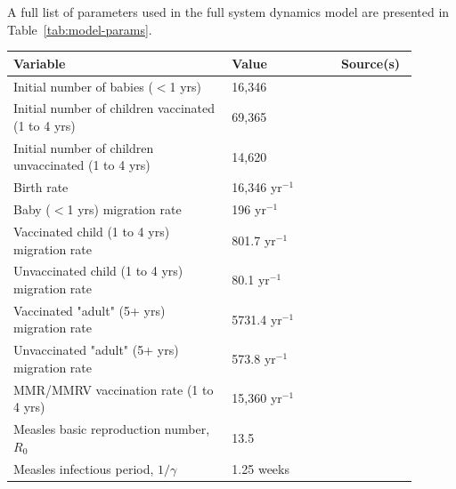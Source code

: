 \documentclass{article}
\begin{document}
A full list of parameters used in the full system dynamics model are presented in Table~\ref{tab:model-params}. 

\begin{table}[ht!]
    \begin{tabular}{p{0.5\linewidth} | p{0.25\linewidth} | p{0.15\linewidth}}
    \toprule
    \textbf{Variable} & \textbf{Value} & \textbf{Source(s)}\\ \midrule
    
    Initial number of babies ($<$1 yrs) & 16,346 & \cite{ONS2021census} \\
    
    Initial number of children vaccinated (1 to 4 yrs) & 69,365&  \cite{ONS2021census, NHSEngland2026FDP}  \\
    
    Initial number of children unvaccinated (1 to 4 yrs) & 14,620 & \cite{ONS2021census, NHSEngland2026FDP} \\
    
    Birth rate & 16,346 yr$^{-1}$ & \cite{ONS2021census} \\
    
    Baby ($<$1 yrs) migration rate & 196 yr$^{-1}$ & \cite{ONS2021census} \\
    
    Vaccinated child (1 to 4 yrs) migration rate & 801.7 yr$^{-1}$ & \cite{ONS2021census, WHO_measles_coverage} \\
    
    Unvaccinated child (1 to 4 yrs) migration rate & 80.1 yr$^{-1}$ & \cite{ONS2021census, WHO_measles_coverage} \\

    Vaccinated "adult" (5+ yrs) migration rate & 5731.4 yr$^{-1}$ & \cite{ONS2021census, WHO_measles_coverage} \\
    
    Unvaccinated "adult" (5+ yrs) migration rate & 573.8 yr$^{-1}$ & \cite{ONS2021census, WHO_measles_coverage} \\

    MMR/MMRV vaccination rate (1 to 4 yrs) & 15,360 yr$^{-1}$ & \cite{NHSEngland2026FDP} \\

    Measles basic reproduction number, $R_0$ & 13.5 & \cite{https://doi.org/10.1111/risa.12637} \\

    Measles infectious period, $1/\gamma$ & 1.25 weeks & \cite{WHO2025MeaslesFactsheet} \\


\end{tabular}
\end{table}
\end{document}
